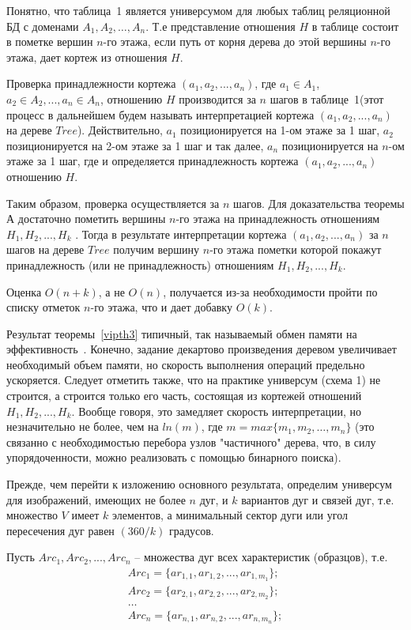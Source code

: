 Понятно, что таблица~1 является универсумом для любых таблиц реляционной БД с доменами $A_1, A_2,\ldots,A_n$. Т.е представление отношения $H$ в таблице состоит в пометке вершин $n$-го этажа, если путь от корня дерева до этой вершины $n$-го этажа, дает кортеж из отношения $H$.

Проверка принадлежности кортежа $(a_1,a_2, ..., a_n)$, где $a_1 \in A_1$, $a_2 \in A_2, ..., a_n \in A_n$, отношению $H$ производится за $n$ шагов в таблице~1(этот процесс в дальнейшем будем называть интерпретацией кортежа $(a_1,a_2, ..., a_n)$ на дереве $Tree$). Действительно, $a_1$ позиционируется на 1-ом этаже за 1 шаг, $a_2$ позиционируется на 2-ом этаже за 1 шаг и так далее, $a_n$ позиционируется на $n$-ом этаже за 1 шаг, где и определяется принадлежность кортежа $(a_1,a_2, ..., a_n)$ отношению $H$.

Таким образом, проверка осуществляется за $n$ шагов. Для доказательства теоремы $А$ достаточно пометить вершины $n$-го этажа на принадлежность отношениям $H_1, H_2, ..., H_k$ . Тогда в результате интерпретации кортежа $(a_1,a_2, ..., a_n)$ за $n$ шагов на дереве $Tree$ получим вершину $n$-го этажа пометки которой покажут принадлежность (или не принадлежность) отношениям $H_1, H_2, ..., H_k$.

Оценка $O(n+k)$, а не $O(n)$, получается из-за необходимости пройти по списку отметок $n$-го этажа, что и дает добавку $O(k)$.

\begin{remark}
Результат теоремы~\ref{vipth3} типичный, так называемый обмен памяти на эффективность~\cite{5}.
Конечно, задание декартово произведения деревом увеличивает необходимый объем памяти, но скорость выполнения операций предельно ускоряется. Следует отметить также, что на практике универсум (схема 1) не строится, а строится только его часть, состоящая из кортежей отношений $H_1, H_2, ..., H_k$. Вообще говоря, это замедляет скорость интерпретации, но незначительно не более, чем на $ln(m)$, где $m = max\{ m_1, m_2, …, m_n\}$ 
(это связанно с необходимостью перебора узлов "частичного" дерева, что, в силу упорядоченности, можно реализовать с помощью бинарного поиска).
\end{remark}

Прежде, чем перейти к изложению основного результата, определим универсум для изображений, имеющих не более $n$ дуг, и $k$ вариантов дуг и связей дуг, т.е. множество $V$ имеет $k$ элементов, а минимальный сектор дуги или угол пересечения дуг равен $(360/k)$ градусов.

Пусть $Arc_1, Arc_2, ..., Arc_n$ – множества дуг всех характеристик (образцов), т.е.
\begin{equation}
\begin{array}{c}
Arc_1 = \{ar_{1,1}, ar_{1,2}, ..., ar_{1,m_1}\}; \\
Arc_2 = \{ ar_{2,1}, ar_{2,2}, ..., ar_{2,m_2}\}; \\
\dots \\
Arc_n = \{ ar_{n,1}, ar_{n,2}, ..., ar_{n,m_n}\}; \\
\end{array}
\end{equation}

